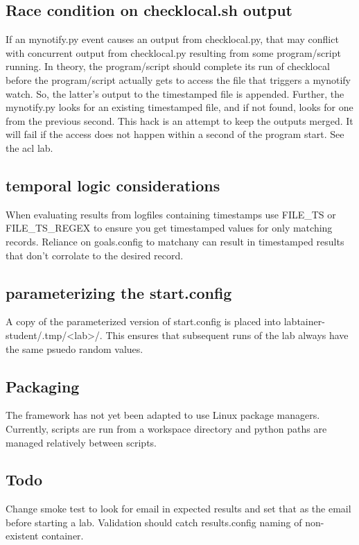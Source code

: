 \documentclass[12pt]{article}
\begin{document}
\subsection {Race condition on checklocal.sh output}
If an mynotify.py event causes an output from checklocal.py, that may conflict with
concurrent output from checklocal.py resulting from some program/script running.  In 
theory, the program/script should complete its run of checklocal before the program/script
actually gets to access the file that triggers a mynotify watch.  So, the latter's output
to the timestamped file is appended.  Further, the mynotify.py looks for an existing timestamped
file, and if not found, looks for one from the previous second.  This hack is an attempt to
keep the outputs merged.  It will fail if the access does not happen within a second of the
program start.  See the acl lab.

\subsection {temporal logic considerations}
When evaluating results from logfiles containing timestamps use FILE\_TS or FILE\_TS\_REGEX
to ensure you get timestamped values for only matching records. Reliance on goals.config to
matchany can result in timestamped results that don't corrolate to the desired record. 

\subsection {parameterizing the start.config}
A copy of the parameterized version of start.config is placed into 
labtainer-student/.tmp/<lab>/.  This ensures that subsequent runs of the lab always
have the same psuedo random values.

\subsection {Packaging}
The framework has not yet been adapted to use Linux package managers.
Currently, scripts are run from a workspace directory and python
paths are managed relatively between scripts.  

\subsection{Todo}
Change smoke test to look for email in expected results and set that as the email before starting a lab.
Validation should catch results.config naming of non-existent container.
\end{document}
